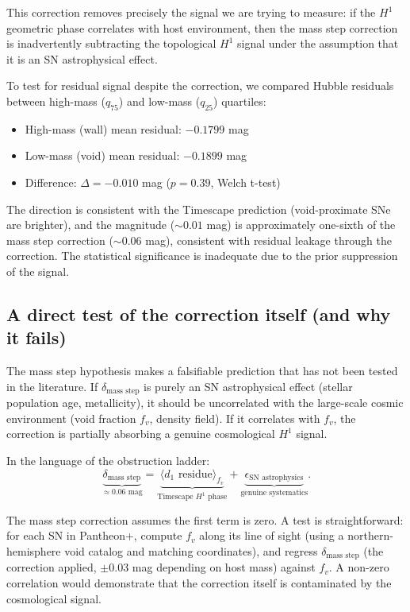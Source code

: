 \documentclass[11pt]{article}
\begin{document}
This correction removes precisely the signal we are trying to
measure: if the $H^1$ geometric phase correlates with host
environment, then the mass step correction is inadvertently
subtracting the topological $H^1$ signal under the assumption
that it is an SN astrophysical effect.

To test for residual signal despite the correction, we compared
Hubble residuals between high-mass ($q_{75}$) and low-mass
($q_{25}$) quartiles:

\begin{itemize}
  \item High-mass (wall) mean residual: $-0.1799$ mag
  \item Low-mass (void) mean residual: $-0.1899$ mag
  \item Difference: $\Delta = -0.010$ mag ($p = 0.39$, Welch t-test)
\end{itemize}

The direction is consistent with the Timescape prediction
(void-proximate SNe are brighter), and the magnitude
($\sim 0.01$ mag) is approximately one-sixth of the mass step
correction ($\sim 0.06$ mag), consistent with residual leakage
through the correction. The statistical significance is inadequate
due to the prior suppression of the signal.

\subsection{A direct test of the correction itself (and why it fails)}
\label{sec:test-correction}

The mass step hypothesis makes a falsifiable prediction that has
not been tested in the literature. If $\delta_{\text{mass step}}$
is purely an SN astrophysical effect (stellar population age,
metallicity), it should be uncorrelated with the large-scale
cosmic environment (void fraction $f_v$, density field).
If it correlates with $f_v$, the correction is partially absorbing
a genuine cosmological $H^1$ signal.

In the language of the obstruction ladder:
\[
\underbrace{\delta_{\text{mass step}}}_{\approx 0.06\text{ mag}}
= \underbrace{\langle d_1 \text{ residue} \rangle_{f_v}}_{\text{Timescape } H^1 \text{ phase}}
+ \underbrace{\epsilon_{\text{SN astrophysics}}}_{\text{genuine systematics}}.
\]

The mass step correction assumes the first term is zero. A test
is straightforward: for each SN in Pantheon+, compute $f_v$
along its line of sight (using a northern-hemisphere void catalog
and matching coordinates), and regress $\delta_{\text{mass step}}$
(the correction applied, $\pm 0.03$ mag depending on host mass)
against $f_v$. A non-zero correlation would demonstrate that the
correction itself is contaminated by the cosmological signal.
\end{document}
